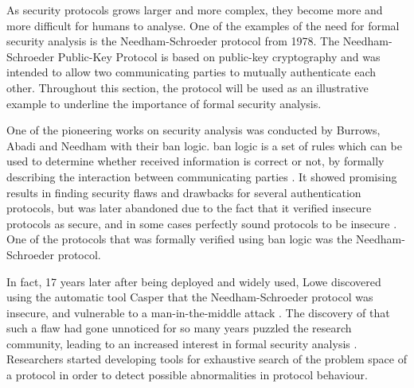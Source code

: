 As security protocols grows larger and more complex, they become more and more difficult for humans to analyse. One of the examples of the need for formal security analysis is the Needham-Schroeder protocol \cite{Needham:1978} from 1978. The Needham-Schroeder Public-Key Protocol is based on public-key cryptography and was intended to allow two communicating parties to mutually authenticate each other. Throughout this section, the protocol will be used as an illustrative example to underline the importance of formal security analysis.

One of the pioneering works on security analysis was conducted by Burrows, Abadi and Needham with their \gls{ban} logic. \gls{ban} logic is a set of rules which can be used to determine whether received information is correct or not, by formally describing the interaction between communicating parties \cite{burrows1989logic}. It showed promising results in finding security flaws and drawbacks for several authentication protocols, but was later abandoned due to the fact that it verified insecure protocols as secure, and in some cases perfectly sound protocols to be insecure \cite{boyd1993}. One of the protocols that was formally verified using \gls{ban} logic was the Needham-Schroeder protocol.

In fact, 17 years later after being deployed and widely used, Lowe discovered using the automatic tool Casper that the Needham-Schroeder protocol was insecure, and vulnerable to a man-in-the-middle attack \cite{basin2011model} \cite{lowe1996}. The discovery of that such a flaw had gone unnoticed for so many years puzzled the research community, leading to an increased interest in formal security analysis \cite{cremers2009comparing}. Researchers started developing tools for exhaustive search of the problem space of a protocol in order to detect possible abnormalities in protocol behaviour. 




